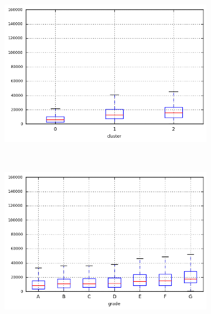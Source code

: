 \begin{anexosenv}
\begin{figure}[t!]
\begin{subfigure}[t]{0.45\textwidth}
            \centerline{\includegraphics[width=1\textwidth]{img/revol_bal_by_cluster}}
        \end{subfigure}%
        ~ 
        \begin{subfigure}[t]{0.45\textwidth}
            \centering
   
            \centerline{\includegraphics[width=1\textwidth]{img/revol_bal_by_grade}}

        \end{subfigure}
        \\
                \caption{\emph{Boxplots} de total\textunderscore acc}
        \begin{subfigure}[t]{0.45\textwidth}
            \centering


\end{subfigure}
\end{figure}
\end{anexosenv}
